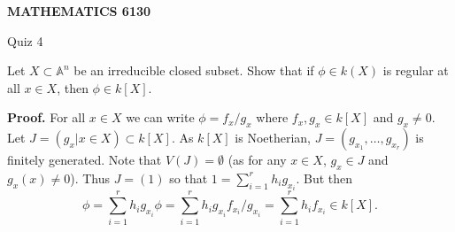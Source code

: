 \documentclass[12pt]{amsart}
\begin{document}
\bigskip\bigskip\bigskip\bigskip
\centerline{\bf MATHEMATICS 6130}
\centerline{Quiz 4}

 Let $X\subset \mathbb A ^n$ be an irreducible closed subset. Show that if 
$\phi \in k(X)$ is regular at all $x\in X$, then $\phi \in k[X]$.

{\bf Proof.} For all $x\in X$ we can write $\phi =f_x/g_x$ where $f_x,g_x\in k[X]$ and $g_x\ne 0$. Let $J=(g_x|x\in X)\subset k[X]$. As $k[X]$ is Noetherian, $J=(g_{x_1},\ldots ,g_{x_r} )$ is finitely generated. Note that $V(J)=\emptyset$ (as for any $x\in X$, $g_x\in J$ and $g_x(x)\ne 0$). Thus $J=(1)$ so that $1=\sum _{i=1}^rh_ig_{x_i}$. But then $$\phi= \sum  _{i=1}^rh_ig_{x_i}\phi= \sum  _{i=1}^rh_ig_{x_i}f_{x_i}/g_{x_i}= \sum  _{i=1}^rh_if_{x_i}\in k[X].$$
\end{document}

